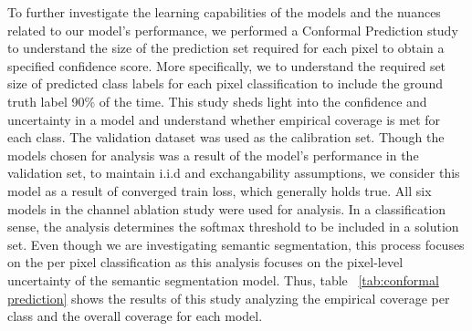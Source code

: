 \documentclass{article}
\begin{document}
To further investigate the learning capabilities of the models and the nuances related to our model's performance, we performed a Conformal Prediction \cite{DBLP:journals/corr/abs-2107-07511} study to understand the size of the prediction set required for each pixel to obtain a specified confidence score. More specifically, we to understand the required set size of predicted class labels for each pixel classification to include the ground truth label 90\% of the time. This study sheds light into the confidence and uncertainty in a model and understand whether empirical coverage is met for each class. The validation dataset was used as the calibration set. Though the models chosen for analysis was a result of the model's performance in the validation set, to maintain i.i.d and exchangability assumptions, we consider this model as a result of converged train loss, which generally holds true. All six models in the channel ablation study were used for analysis. In a classification sense, the analysis determines the softmax threshold to be included in a solution set. Even though we are investigating semantic segmentation, this process focuses on the per pixel classification as this analysis focuses on the pixel-level uncertainty of the semantic segmentation model. Thus, table ~\ref{tab:conformal prediction} shows the results of this study analyzing the empirical coverage per class and the overall coverage for each model. 

\begin{table}[h]
  \caption{Conformal Prediction Empirical coverage w.r.t $90\%$ confidence score}
  \label{tab:conformal prediction}
  \centering
\end{table}
\end{document}
